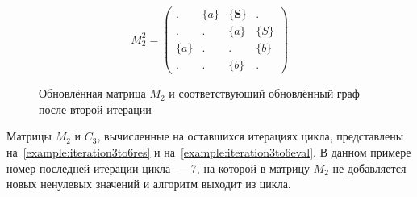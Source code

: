 \begin{figure}
    \begin{subfigure}[]{0.5\textwidth}
    \centering
    $$
    M_2^2 =
    \begin{pmatrix}
    .     & \{a\} & \{\textbf{S}\} & .     \\
    .     & .     & \{a\} & \{S\} \\
    \{a\} & .     & .     & \{b\} \\
    .     & .     & \{b\} & .
    \end{pmatrix}
    $$
    \end{subfigure}
    \begin{subfigure}[]{0.4\textwidth}
    \centering
    \end{subfigure}
    \caption{Обновлённая матрица $M_2$ и соответствующий обновлённый граф после второй итерации}
    \label{example:iteration2res}
\end{figure}

Матрицы $M_2$ и $C_3$, вычисленные на оставшихся итерациях цикла, представлены на~\cref{example:iteration3to6res} и на~\cref{example:iteration3to6eval}.
В данном примере номер последней итерации цикла~--- 7, на которой в матрицу $M_2$ не добавляется новых ненулевых значений и алгоритм выходит из цикла.



